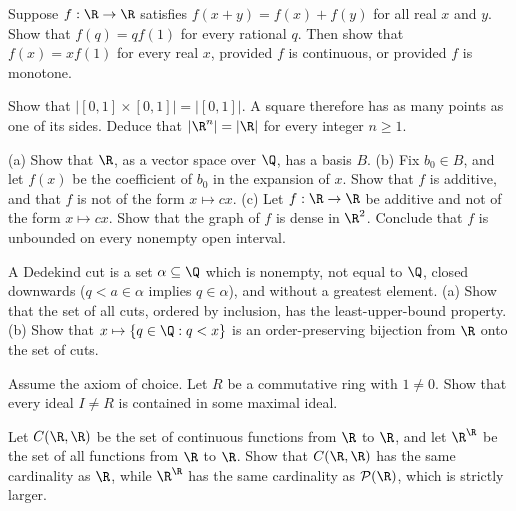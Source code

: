 \begin{exercise}[$\star$]\label{ex:cauchyfe}
Suppose $f:\R\to\R$ satisfies $f(x+y)=f(x)+f(y)$ for all real $x$ and $y$. Show that $f(q)=qf(1)$ for every rational $q$. Then show that $f(x)=xf(1)$ for every real $x$, provided $f$ is continuous, or provided $f$ is monotone.
\end{exercise}

\begin{exercise}[$\star\star$]\label{ex:square}
Show that $|[0,1]\times[0,1]|=|[0,1]|$. A square therefore has as many points as one of its sides. Deduce that $|\R^n|=|\R|$ for every integer $n\ge 1$.
\end{exercise}

\begin{exercise}[$\star\star$]\label{ex:hamel}
(a) Show that $\R$, as a vector space over $\Q$, has a basis $B$. (b) Fix $b_0\in B$, and let $f(x)$ be the coefficient of $b_0$ in the expansion of $x$. Show that $f$ is additive, and that $f$ is not of the form $x\mapsto cx$. (c) Let $f:\R\to\R$ be additive and not of the form $x\mapsto cx$. Show that the graph of $f$ is dense in $\R^2$. Conclude that $f$ is unbounded on every nonempty open interval.
\end{exercise}

\begin{exercise}[$\star\star$]\label{ex:cuts}
A Dedekind cut is a set $\alpha\subseteq\Q$ which is nonempty, not equal to $\Q$, closed downwards ($q<a\in\alpha$ implies $q\in\alpha$), and without a greatest element. (a) Show that the set of all cuts, ordered by inclusion, has the least-upper-bound property. (b) Show that $x\mapsto\{q\in\Q:q<x\}$ is an order-preserving bijection from $\R$ onto the set of cuts.
\end{exercise}

\begin{exercise}[$\star\star$]\label{ex:krull}
Assume the axiom of choice. Let $R$ be a commutative ring with $1\ne 0$. Show that every ideal $I\ne R$ is contained in some maximal ideal.
\end{exercise}

\begin{exercise}[$\star\star$]\label{ex:functions}
Let $C(\R,\R)$ be the set of continuous functions from $\R$ to $\R$, and let $\R^\R$ be the set of all functions from $\R$ to $\R$. Show that $C(\R,\R)$ has the same cardinality as $\R$, while $\R^\R$ has the same cardinality as $\mathcal P(\R)$, which is strictly larger.
\end{exercise}


